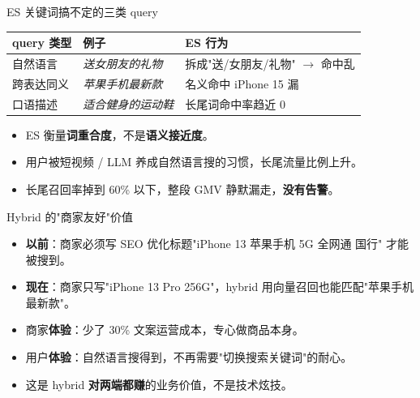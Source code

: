 \documentclass[aspectratio=169,11pt]{beamer}
\begin{document}
\begin{frame}[shrink]{ES 关键词搞不定的三类 query}
\begin{tabular}{@{}lll@{}}
\toprule
query 类型 & 例子                      & ES 行为                            \\
\midrule
自然语言   & \textit{送女朋友的礼物}    & 拆成"送/女朋友/礼物" $\to$ 命中乱 \\
跨表达同义 & \textit{苹果手机最新款}    & 名义命中 iPhone 15 漏              \\
口语描述   & \textit{适合健身的运动鞋} & 长尾词命中率趋近 0                 \\
\bottomrule
\end{tabular}
\vspace{2mm}
\begin{itemize}
  \item ES 衡量\textbf{词重合度}，不是\textbf{语义接近度}。
  \item 用户被短视频 / LLM 养成自然语言搜的习惯，长尾流量比例上升。
  \item 长尾召回率掉到 60\% 以下，整段 GMV 静默漏走，\textbf{没有告警}。
\end{itemize}
\end{frame}

\begin{frame}[shrink]{Hybrid 的"商家友好"价值}
\begin{itemize}
  \item \textbf{以前}：商家必须写 SEO 优化标题"iPhone 13 苹果手机 5G 全网通 国行" 才能被搜到。
  \item \textbf{现在}：商家只写"iPhone 13 Pro 256G"，hybrid 用向量召回也能匹配"苹果手机最新款"。
  \item 商家\textbf{体验}：少了 30\% 文案运营成本，专心做商品本身。
  \item 用户\textbf{体验}：自然语言搜得到，不再需要"切换搜索关键词"的耐心。
  \item 这是 hybrid \textbf{对两端都赚}的业务价值，不是技术炫技。
\end{itemize}
\end{frame}
\end{document}
